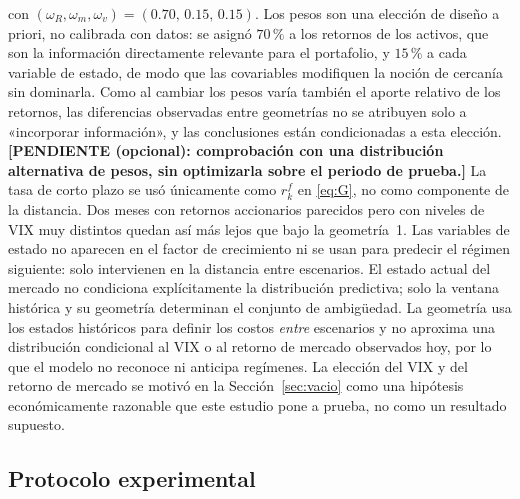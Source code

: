 con $(\omega_R,\omega_m,\omega_v)=(0.70,\,0.15,\,0.15)$. Los pesos son una elección de diseño a priori, no calibrada con datos: se asignó $70\,\%$ a los retornos de los activos, que son la información directamente relevante para el portafolio, y $15\,\%$ a cada variable de estado, de modo que las covariables modifiquen la noción de cercanía sin dominarla. Como al cambiar los pesos varía también el aporte relativo de los retornos, las diferencias observadas entre geometrías no se atribuyen solo a «incorporar información», y las conclusiones están condicionadas a esta elección. \textbf{[PENDIENTE (opcional): comprobación con una distribución alternativa de pesos, sin optimizarla sobre el periodo de prueba.]} La tasa de corto plazo
 se usó únicamente como $r^f_k$ en \eqref{eq:G}, no como componente de la distancia. Dos meses con retornos accionarios parecidos pero con niveles de VIX muy distintos quedan así más lejos que bajo la geometría~1. 
Las variables de estado no aparecen en el factor de crecimiento ni se usan para predecir el régimen siguiente: solo intervienen en la distancia entre escenarios. El estado actual del mercado no condiciona explícitamente la distribución predictiva; solo la ventana histórica y su geometría determinan el conjunto de ambigüedad. La geometría usa los estados históricos para definir los costos \emph{entre} escenarios y no aproxima una distribución condicional al VIX o al retorno de mercado observados hoy, por lo que el modelo no reconoce ni anticipa regímenes. La elección del VIX y del retorno de mercado se motivó en la Sección~\ref{sec:vacio} \citep{whaley2000,french1987} como una hipótesis económicamente razonable que este estudio pone a prueba, no como un resultado supuesto.


\subsection{Protocolo experimental}\label{sec:protocolo}

